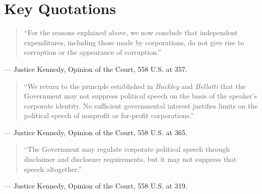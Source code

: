 \documentclass[12pt]{article}
\begin{document}
\section{Key Quotations}

\begin{quote}
``For the reasons explained above, we now conclude that independent expenditures, including those made by corporations, do not give rise to corruption or the appearance of corruption.''
\end{quote}
\noindent --- Justice Kennedy, Opinion of the Court, 558 U.S. at 357.

\begin{quote}
``We return to the principle established in \textit{Buckley} and \textit{Bellotti} that the Government may not suppress political speech on the basis of the speaker's corporate identity. No sufficient governmental interest justifies limits on the political speech of nonprofit or for-profit corporations.''
\end{quote}
\noindent --- Justice Kennedy, Opinion of the Court, 558 U.S. at 365.

\begin{quote}
``The Government may regulate corporate political speech through disclaimer and disclosure requirements, but it may not suppress that speech altogether.''
\end{quote}
\noindent --- Justice Kennedy, Opinion of the Court, 558 U.S. at 319.
\end{document}
